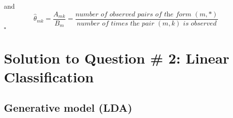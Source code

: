 \documentclass[9pt]{article}
\begin{document}
and
\begin{equation}
\hat{\theta}_{mk} = \frac{A_{mk}}{B_{m}} = \frac{\textit{number of observed pairs of the form  }(m, *)}{\textit{number of times the pair  }(m, k)\textit{ is observed}}
\end{equation}$\square$\\

\section{Solution to Question \# 2: Linear Classification}
\subsection{Generative model (LDA)}
\end{document}
